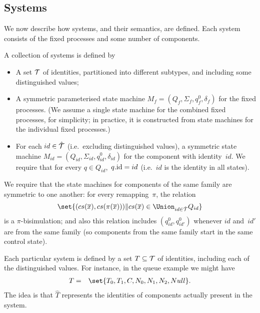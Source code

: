 \subsection{Systems}

We now describe how systems, and their semantics, are defined. 
Each system consists of the fixed processes and some number of components. 
%
\begin{definition}
\label{def:system}
A collection of systems is defined by
%
\begin{itemize}
\item A set $\mathcal{T}$ of identities, partitioned into different subtypes, and
  including some distinguished values;

\item A symmetric parameterised state machine $M_f = (Q_f, \Sigma_f, q_f^0,
  \delta_f)$ for the fixed processes.  (We assume a single state machine for
  the combined fixed processes, for simplicity; in practice, it is constructed
  from state machines for the individual fixed processes.)

\item For each $id \in \hat{\mathcal{T}}$ (i.e.~excluding distinguished values), a
  symmetric state machine $M_{id} = (Q_{id}, \Sigma_{id}, q_{id}^0,
  \delta_{id})$ for the component with identity~$id$.  We require that for
  every $q \in Q_{id}$,\, $q.\mathrm{id} = id$ (i.e.~$id$ is the identity in all
  states).

\end{itemize}

We require that the state machines for components of the same family are
symmetric to one another: for every remapping~$\pi$, the relation
\[
\set{ (cs(\vec{x}), cs(\pi(\vec{x}))) \| 
  cs(\vec{x}) \in \textstyle\Union_{id \in \hat{\T}} Q_{id}}
\]
is a $\pi$-bisimulation; and also this relation includes $(q^0_{id},
q^0_{id'})$ whenever $id$ and~$id'$ are from the same family (so components
from the same family start in the same control state).

Each particular system is defined by a set $T \subseteq \mathcal{T}$ of identities,
including each of the distinguished values.  For instance, in the queue
example we might have
%
\begin{eqnarray*}
T & = & \set{T_0, T_1, C, N_0, N_1, N_2, Null}. \\
\end{eqnarray*}
%
The idea is that $\hat{T}$ represents the identities of components actually
present in the system.


\end{definition}
